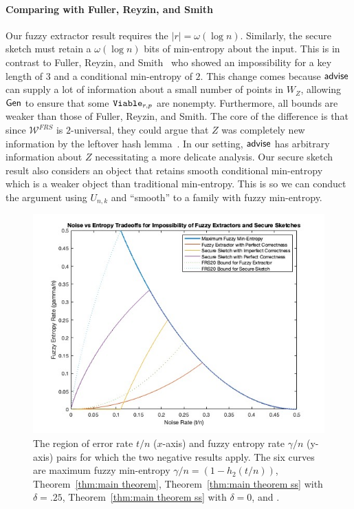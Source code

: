 \paragraph{Comparing with Fuller, Reyzin, and Smith~\cite{fuller2020computational}}
Our fuzzy extractor result requires the $|r| = \omega(\log n)$.  Similarly, the secure sketch must retain a $\omega(\log n)$ bits of min-entropy about the input. This is in contrast to Fuller, Reyzin, and Smith~\cite{fuller2020computational} who showed an impossibility for a key length of $3$ and a conditional min-entropy of $2$.  This change comes because ${\mathsf{advise}}$ can supply a lot of information about a small number of points in $W_Z$, allowing ${\mathsf{Gen}}$ to ensure that some $\mathtt{Viable}_{r,p}$ are nonempty. Furthermore, all bounds are weaker than those of Fuller, Reyzin, and Smith.  The core of the difference is that since $\mathcal{W}^{FRS}$ is $2$-universal, they could argue that $Z$ was completely new information by the leftover hash lemma~\cite{haastad1993construction,barak2011leftover}. In our setting, ${\mathsf{advise}}$ has arbitrary information about $Z$ necessitating a more delicate analysis. Our secure sketch result also considers an object that retains smooth conditional min-entropy~\cite{renner2005simple} which is a weaker object than traditional min-entropy.  This is so we can conduct the argument using $U_{n,k}$ and ``smooth'' to a family with fuzzy min-entropy. 


\begin{figure}[t]
\centering
\includegraphics[width=.8\textwidth]{EntropyvsError.jpg}
\caption{The region of error rate $t/n$ ($x$-axis) and fuzzy entropy rate $\gamma/n$ (y-axis) pairs for which the two negative results apply.  The six curves are maximum fuzzy min-entropy $\gamma/n = (1-h_2(t/n))$, Theorem~\ref{thm:main theorem}, Theorem~\ref{thm:main theorem ss} with $\delta=.25$,  Theorem~\ref{thm:main theorem ss} with $\delta =0$, \cite[Theorem 5.1]{fuller2020fuzzy} and \cite[Theorem 7.2]{fuller2020fuzzy}.}
\label{fig:param regime}
\end{figure}

